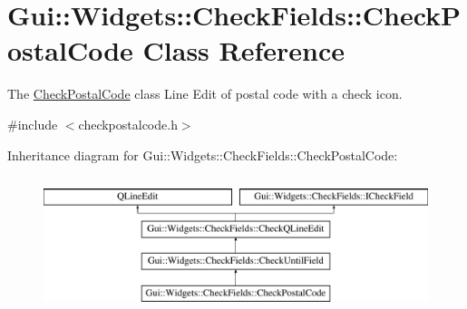 \hypertarget{classGui_1_1Widgets_1_1CheckFields_1_1CheckPostalCode}{\section{Gui\-:\-:Widgets\-:\-:Check\-Fields\-:\-:Check\-Postal\-Code Class Reference}
\label{classGui_1_1Widgets_1_1CheckFields_1_1CheckPostalCode}
}


The \hyperlink{classGui_1_1Widgets_1_1CheckFields_1_1CheckPostalCode}{Check\-Postal\-Code} class Line Edit of postal code with a check icon.  




{\ttfamily \#include $<$checkpostalcode.\-h$>$}

Inheritance diagram for Gui\-:\-:Widgets\-:\-:Check\-Fields\-:\-:Check\-Postal\-Code\-:\begin{figure}[H]
\begin{center}
\leavevmode
\includegraphics[height=4.000000cm]{df/d31/classGui_1_1Widgets_1_1CheckFields_1_1CheckPostalCode}
\end{center}
\end{figure}

